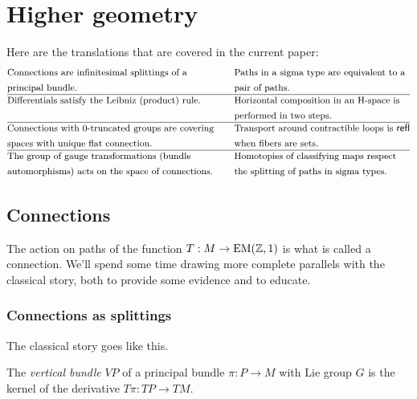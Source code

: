 \section{Higher geometry}

Here are the translations that are covered in the current paper:
\begin{align*}
& \text{\small Connections are infinitesimal splittings of a} & \quad &\text{\small Paths in a sigma type are equivalent to a}        \\
& \text{\small principal bundle.} & \quad&\text{\small pair of paths.}        \\ \hline
& \text{\small Differentials satisfy the Leibniz (product) rule.} &\quad  &\text{\small Horizontal composition in an H-space is} \\ 
&  &  \quad&\text{\small performed in two steps.} \\ \hline
& \text{\small Connections with 0-truncated groups are covering}        &\quad &\text{\small Transport around contractible loops is } \mathsf{refl}             \\ 
& \text{\small spaces with unique flat connection.}        & \quad&\text{\small when fibers are sets.}             \\ \hline
& \text{\small The group of gauge transformations (bundle} &\quad &\text{\small Homotopies of classifying maps respect } \\ 
& \text{\small automorphisms) acts on the space of connections.} & \quad&\text{\small the splitting of paths in sigma types.} \\ 
\end{align*}

\subsection{Connections}

The action on paths of the function \( T:M\to \mathrm{EM}(\mathbb{Z},1) \) is what is called a connection. We'll spend some time drawing more complete parallels with the classical story, both to provide some evidence and to educate. 

\subsubsection{Connections as splittings}

The classical story goes like this.

\begin{mydef}
The \emph{vertical bundle} \( VP \) of a principal bundle \( \pi:P\to M \) with Lie group \( G \) is the kernel of the derivative \( T\pi:TP\to TM \). 
\end{mydef}

